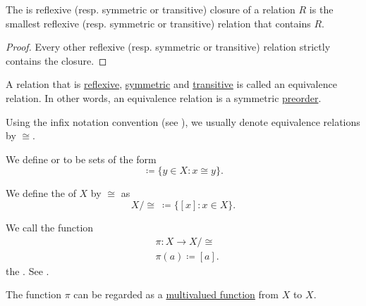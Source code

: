 \begin{proposition}\label{thm:derived_relations_characterization}
  The is reflexive (resp. symmetric or transitive) closure of a relation \( R \) is the smallest reflexive (resp. symmetric or transitive) relation that contains \( R \).
\end{proposition}
\begin{proof}
  Every other reflexive (resp. symmetric or transitive) relation strictly contains the closure.
\end{proof}

\begin{definition}\label{def:equivalence_relation}
  A relation that is \hyperref[def:binary_relation/reflexive]{reflexive}, \hyperref[def:binary_relation/symmetric]{symmetric} and \hyperref[def:binary_relation/transitive]{transitive} is called an equivalence relation. In other words, an equivalence relation is a symmetric \hyperref[def:preordered_set]{preorder}.

  Using the infix notation convention (see ), we usually denote equivalence relations by \( \cong \).

  \begin{DefEnum}
     We define  or  to be sets of the form
    \begin{equation*}
      [x] \coloneqq \{ y \in X \colon x \cong y \}.
    \end{equation*}

     We define the  of \( X \) by \( \cong \) as
    \begin{equation*}
      X / \cong \ \coloneqq \{ [x] \colon x \in X \}.
    \end{equation*}

     We call the function
    \begin{align*}
       & \pi: X \to X / \cong  \\
       & \pi(a) \coloneqq [a].
    \end{align*}
    the . See .

    The function \( \pi \) can be regarded as a \hyperref[def:function/multivalued]{multivalued function} from \( X \) to \( X \).
  \end{DefEnum}
\end{definition}

